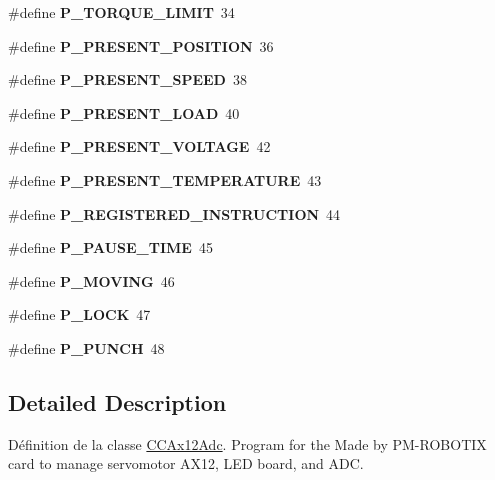 \begin{DoxyCompactItemize}
\#define {\bfseries P\+\_\+\+T\+O\+R\+Q\+U\+E\+\_\+\+L\+I\+M\+IT}~34
\item 
\mbox{\label{Driver-OPOS6UL__ARM_2CCAx12Adc_8hpp_abcad901941fd2d417d60115ed1a3d55d}} 
\#define {\bfseries P\+\_\+\+P\+R\+E\+S\+E\+N\+T\+\_\+\+P\+O\+S\+I\+T\+I\+ON}~36
\item 
\mbox{\label{Driver-OPOS6UL__ARM_2CCAx12Adc_8hpp_ac72fc9a76224e1c10adcbc2d159f1ce6}} 
\#define {\bfseries P\+\_\+\+P\+R\+E\+S\+E\+N\+T\+\_\+\+S\+P\+E\+ED}~38
\item 
\mbox{\label{Driver-OPOS6UL__ARM_2CCAx12Adc_8hpp_a7e52f36cffc7ef4a175a0af0e2e76ffe}} 
\#define {\bfseries P\+\_\+\+P\+R\+E\+S\+E\+N\+T\+\_\+\+L\+O\+AD}~40
\item 
\mbox{\label{Driver-OPOS6UL__ARM_2CCAx12Adc_8hpp_a43da4c4e7fa482dffa4b9dbd277d391b}} 
\#define {\bfseries P\+\_\+\+P\+R\+E\+S\+E\+N\+T\+\_\+\+V\+O\+L\+T\+A\+GE}~42
\item 
\mbox{\label{Driver-OPOS6UL__ARM_2CCAx12Adc_8hpp_ab029ba61a7bff3225e3914f77294c74e}} 
\#define {\bfseries P\+\_\+\+P\+R\+E\+S\+E\+N\+T\+\_\+\+T\+E\+M\+P\+E\+R\+A\+T\+U\+RE}~43
\item 
\mbox{\label{Driver-OPOS6UL__ARM_2CCAx12Adc_8hpp_a55d74e0a821481527c5fbd43a559585b}} 
\#define {\bfseries P\+\_\+\+R\+E\+G\+I\+S\+T\+E\+R\+E\+D\+\_\+\+I\+N\+S\+T\+R\+U\+C\+T\+I\+ON}~44
\item 
\mbox{\label{Driver-OPOS6UL__ARM_2CCAx12Adc_8hpp_ad9de5952e72d14d43c2a24acc83801ba}} 
\#define {\bfseries P\+\_\+\+P\+A\+U\+S\+E\+\_\+\+T\+I\+ME}~45
\item 
\mbox{\label{Driver-OPOS6UL__ARM_2CCAx12Adc_8hpp_af1f378b35a62ab2aab94ae90d4e940c6}} 
\#define {\bfseries P\+\_\+\+M\+O\+V\+I\+NG}~46
\item 
\mbox{\label{Driver-OPOS6UL__ARM_2CCAx12Adc_8hpp_a0f3d3d6df8c4b9c22d65b4dc360637f6}} 
\#define {\bfseries P\+\_\+\+L\+O\+CK}~47
\item 
\mbox{\label{Driver-OPOS6UL__ARM_2CCAx12Adc_8hpp_ae3a4723d4f1ae9e827ba87849f662260}} 
\#define {\bfseries P\+\_\+\+P\+U\+N\+CH}~48
\end{DoxyCompactItemize}


\subsection{Detailed Description}
Définition de la classe \hyperlink{classCCAx12Adc}{C\+C\+Ax12\+Adc}. Program for the Made by P\+M-\/\+R\+O\+B\+O\+T\+IX card to manage servomotor A\+X12, L\+ED board, and A\+DC. 

